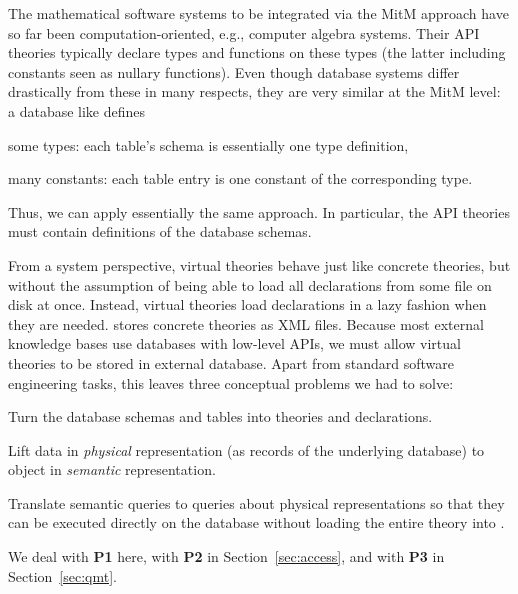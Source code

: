 
The mathematical software systems to be integrated via the MitM approach have so far been computation-oriented, e.g., computer algebra systems.
Their API theories typically declare types and functions on these types (the latter including constants seen as nullary functions).
Even though database systems differ drastically from these in many respects, they are very similar at the MitM level: a database like \lmfdb defines
\begin{compactitem}
 \item some types: each table's schema is essentially one type definition,
 \item many constants: each table entry is one constant of the corresponding type.
\end{compactitem}
Thus, we can apply essentially the same approach.
In particular, the API theories must contain definitions of the database schemas. 

From a system perspective, virtual theories behave just like concrete theories, but without the assumption of being able to load all declarations from some file on disk at once.
Instead, virtual theories load declarations in a lazy fashion when they are needed. 
\mmt stores concrete theories as XML files.
Because most external knowledge bases use databases with low-level APIs, we must allow virtual theories to be stored in external database.
Apart from standard software engineering tasks, this leaves three conceptual problems we had to solve:
\begin{compactenum}[\bf P1]
\item Turn the database schemas and tables into \ommt theories and declarations. 
\item Lift data in \emph{physical} representation (as records of the
  underlying database) to \ommt object in \emph{semantic} representation.
\item Translate semantic queries to queries about physical representations so
  that they can be executed directly on the database without loading the entire theory into
  \mmt.
\end{compactenum}
We deal with \textbf{P1} here, with \textbf{P2} in Section~\ref{sec:access}, and with \textbf{P3} in Section~\ref{sec:qmt}. 

